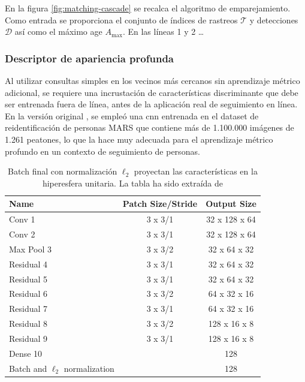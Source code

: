 En la figura \ref{fig:matching-cascade} se recalca el algoritmo de emparejamiento. Como entrada se proporciona el conjunto de índices de rastreos $\mathcal{T}$ y detecciones $\mathcal{D}$ así como el máximo age $A_{\text{max}}$. En las líneas 1 y 2 \ldots

\newpage

\subsubsection*{Descriptor de apariencia profunda}
\label{subsubsec:deep-appearance-descriptor}

Al utilizar consultas simples en los vecinos más cercanos sin aprendizaje métrico adicional, se requiere una incrustación de características discriminante que debe ser entrenada fuera de línea, antes de la aplicación real de seguimiento en línea. En la versión original \cite{Wojke2017simple}, se empleó una \gls{cnn} entrenada en el dataset de reidentificación de personas MARS \cite{10.1007/978-3-319-46466-4_52} que contiene más de 1.100.000 imágenes de 1.261 peatones, lo que la hace muy adecuada para el aprendizaje métrico profundo en un contexto de seguimiento de personas.

\begin{table}[ht]
\centering
\caption{Batch final con normalización $\ell_2$ proyectan las características en la hiperesfera unitaria. La tabla ha sido extraída de \cite{Wojke2017simple}}
\label{tab:final-bach-l2-normalization}
\begin{tabular}{lcc}
\hline
\textbf{Name}                    & \textbf{Patch Size/Stride} & \textbf{Output Size} \\ \hline
Conv 1                           & 3 x 3/1                    & 32 x 128 x 64        \\
Conv 2                           & 3 x 3/1                    & 32 x 128 x 64        \\
Max Pool 3                       & 3 x 3/2                    & 32 x 64 x 32         \\
Residual 4                       & 3 x 3/1                    & 32 x 64 x 32         \\
Residual 5                       & 3 x 3/1                    & 32 x 64 x 32         \\
Residual 6                       & 3 x 3/2                    & 64 x 32 x 16         \\
Residual 7                       & 3 x 3/1                    & 64 x 32 x 16         \\
Residual 8                       & 3 x 3/2                    & 128 x 16 x 8         \\
Residual 9                       & 3 x 3/1                    & 128 x 16 x 8         \\
Dense 10                         &                            & 128                  \\
Batch and $\ell_2$ normalization &                            & 128                  \\ \hline
\end{tabular}
\end{table}

